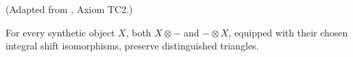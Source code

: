 \begin{theorem}
\label{frontier:Literature:1a607d05c555}
(Adapted from \cite{May01}, Axiom TC2.)\par{}

For every synthetic object $X$, both $X\otimes-$ and $-\otimes X$, equipped with their chosen integral shift isomorphisms, preserve distinguished triangles.
\end{theorem}

